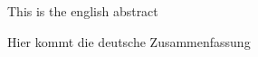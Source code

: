 \clearpage

\label{abstract}
This is the english abstract 

\clearpage

\label{Zusammenfassung}
Hier kommt die deutsche Zusammenfassung

